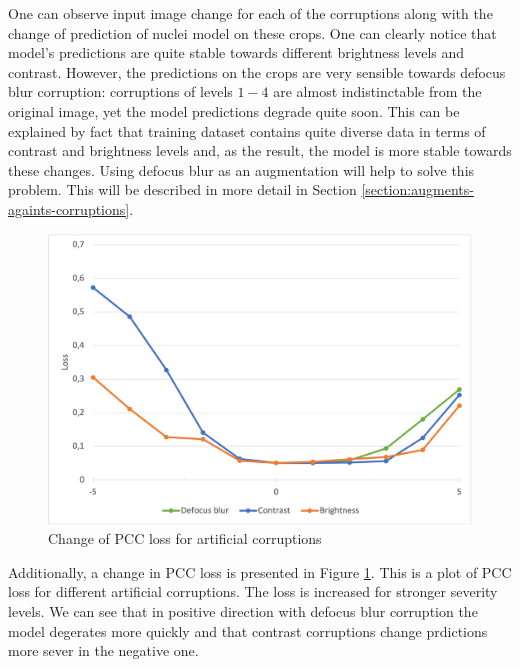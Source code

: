 One can observe input image change for each of the corruptions along with the change of prediction of nuclei model on these crops. One can clearly notice that model's predictions are quite stable towards different brightness levels and contrast. However, the predictions on the crops are very sensible towards defocus blur corruption: corruptions of levels $1-4$ are almost indistinctable from the original image, yet the model predictions degrade quite soon. This can be explained by fact that training dataset contains quite diverse data in terms of contrast and brightness levels and, as the result, the model is more stable towards these changes. Using defocus blur as an augmentation will help to solve this problem. This will be described in more detail in Section \ref{section:augments-againts-corruptions}.
\begin{figure}[H]
	\begin{center}
		\includegraphics[width=0.5\linewidth]{bilder/corruptions-loss.png}
		\caption{Change of PCC loss for artificial corruptions}\label{fig:corruptions-loss}
	\end{center}
\end{figure}

Additionally, a change in PCC loss is presented in Figure \ref{fig:corruptions-loss}. This is a plot of PCC loss for different artificial corruptions. The loss is increased for stronger severity levels. We can see that in positive direction with defocus blur corruption the model degerates more quickly and that contrast corruptions change prdictions more sever in the negative one.